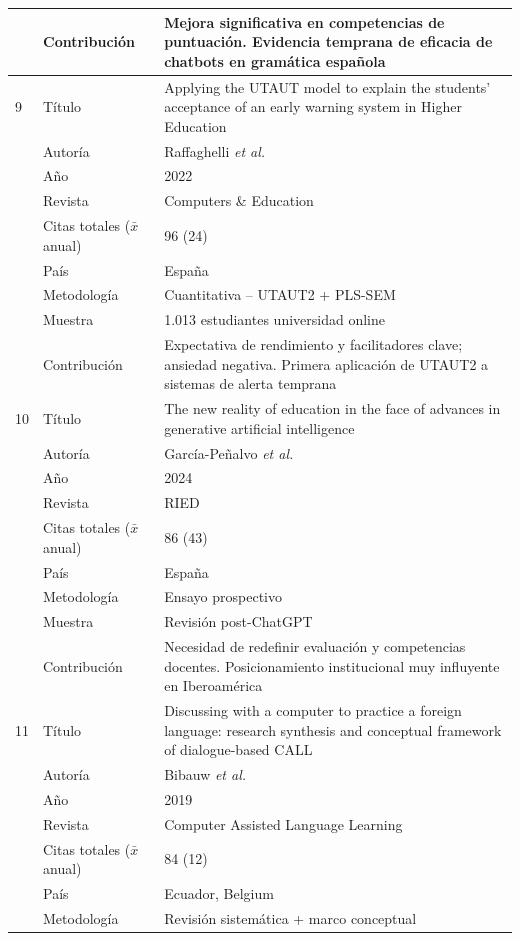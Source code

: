 \documentclass[spanish]{textolivre}
\begin{document}
{\begin{longtable}{@{}p{0.2cm}p{3cm}p{10cm}@{}}
  & Contribución & Mejora significativa en competencias de puntuación. Evidencia temprana de eficacia de chatbots en gramática española\\
\midrule
9 & Título  & Applying the UTAUT model to explain the students' acceptance of an early warning system in Higher Education \\
  & Autoría & Raffaghelli \textit{et al.}\\
  & Año     & 2022\\
  & Revista & Computers \& Education \\
  & Citas totales ($\bar{x}$ anual) & 96 (24) \\
  & País &  España\\
  & Metodología & Cuantitativa -- UTAUT2 + PLS-SEM \\
  & Muestra & 1.013 estudiantes universidad online \\
  & Contribución & Expectativa de rendimiento y facilitadores clave; ansiedad negativa. Primera aplicación de UTAUT2 a sistemas de alerta temprana\\
\midrule
10 & Título  & The new reality of education in the face of advances in generative artificial intelligence \\
  & Autoría & García-Peñalvo \textit{et al.}\\
  & Año     & 2024\\
  & Revista & RIED\\
  & Citas totales ($\bar{x}$ anual) & 86 (43) \\
  & País & España \\
  & Metodología & Ensayo prospectivo \\
  & Muestra & Revisión post-ChatGPT \\
  & Contribución & Necesidad de redefinir evaluación y competencias docentes. Posicionamiento institucional muy influyente en Iberoamérica\\
\midrule
11 & Título  & Discussing with a computer to practice a foreign language: research synthesis and conceptual framework of dialogue-based CALL \\
  & Autoría & Bibauw \textit{et al.}\\
  & Año     & 2019\\
  & Revista & Computer Assisted Language Learning\\
  & Citas totales ($\bar{x}$ anual) & 84 (12)\\
  & País & Ecuador, Belgium \\
  & Metodología & Revisión sistemática + marco conceptual \\

\end{longtable}}
\end{document}
